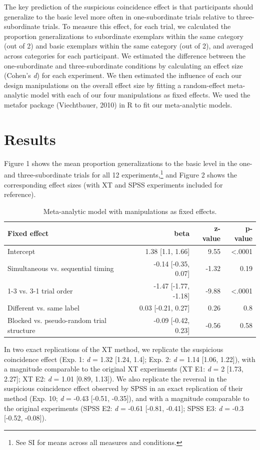 \documentclass[english,floatsintext,man]{apa6}
\theoremstyle{definition}
\theoremstyle{definition}
\theoremstyle{remark}
\begin{document}
The key prediction of the suspicious coincidence effect is that
participants should generalize to the basic level more often in
one-subordinate trials relative to three-subordinate trials. To measure
this effect, for each trial, we calculated the proportion
generalizations to subordinate exemplars within the same category (out
of 2) and basic exemplars within the same category (out of 2), and
averaged across categories for each participant. We estimated the
difference between the one-subordinate and three-subordinate conditions
by calculating an effect size (Cohen's \emph{d}) for each experiment. We
then estimated the influence of each our design manipulations on the
overall effect size by fitting a random-effect meta-analytic model with
each of our four manipulations as fixed effects. We used the metafor
package (Viechtbauer, 2010) in R to fit our meta-analytic models.

\section{Results}\label{results}

Figure 1 shows the mean proportion generalizations to the basic level in
the one- and three-subordinate trials for all 12
experiments,\footnote{See SI for means across all measures and conditions.}
and Figure 2 shows the corresponding effect sizes (with XT and SPSS
experiments included for reference).

\begin{table}

\caption{\label{tab:unnamed-chunk-5}Meta-analytic model with manipulations as fixed effects.}
\centering
\fontsize{12}{14}\selectfont
\begin{tabular}[t]{lrrr}
\toprule
Fixed effect & beta & z-value & p-value\\
\midrule
Intercept & 1.38 [1.1, 1.66] & 9.55 & <.0001\\
Simultaneous vs. sequential timing & -0.14 [-0.35, 0.07] & -1.32 & 0.19\\
1-3 vs. 3-1 trial order & -1.47 [-1.77, -1.18] & -9.88 & <.0001\\
Different vs. same label & 0.03 [-0.21, 0.27] & 0.26 & 0.8\\
Blocked vs. pseudo-random trial structure & -0.09 [-0.42, 0.23] & -0.56 & 0.58\\
\bottomrule
\end{tabular}
\end{table}

In two exact replications of the XT method, we replicate the suspicious
coincidence effect (Exp. 1: \emph{d} = 1.32 {[}1.24, 1.4{]}; Exp. 2:
\emph{d} = 1.14 {[}1.06, 1.22{]}), with a magnitude comparable to the
original XT experiments (XT E1: \emph{d} = 2 {[}1.73, 2.27{]}; XT E2:
\emph{d} = 1.01 {[}0.89, 1.13{]}). We also replicate the reversal in the
suspicious coincidence effect observed by SPSS in an exact replication
of their method (Exp. 10; \emph{d} = -0.43 {[}-0.51, -0.35{]}), and with
a magnitude comparable to the original experiments (SPSS E2: \emph{d} =
-0.61 {[}-0.81, -0.41{]}; SPSS E3: \emph{d} = -0.3 {[}-0.52, -0.08{]}).
\end{document}
